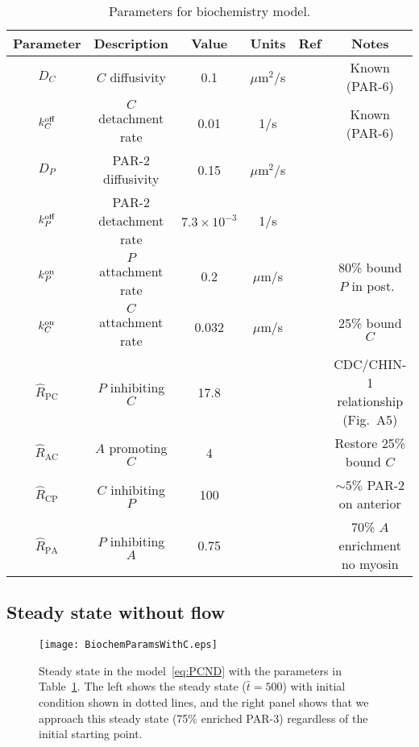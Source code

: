 \documentclass[11pt]{article}
\newcommand{\6}[1]{#1_{\text{6}}}
\newcommand{\3}[1]{#1_{\text{3}}}
\newcommand{\C}[1]{#1_C}
\begin{document}
\begin{table}
\begin{small}
\centering
\begin{tabular}{|c|c|c|c|c|c|}\hline
Parameter & Description & Value & Units & Ref & Notes \\ \hline
$\C{D}$ & $C$ diffusivity & 0.1 & $\mu$m$^2$/s & \cite{robin2014single} & Known (PAR-6)\\
$\C{\koff} $ & $C$ detachment rate & 0.01 & 1/s & \cite{robin2014single}& Known (PAR-6)\\
$D_P$ & PAR-2 diffusivity & 0.15 & $\mu$m$^2$/s & \cite{goehring2011polarization}&  \\ 
$k^\text{off}_P$ & PAR-2 detachment rate & $7.3 \times 10^{-3}$ & 1/s & \cite{goehring2011polarization}& \\ \hline
$k^\text{on}_P$ & $P$ attachment rate & 0.2 & $\mu$m/s & & 80\% bound $P$ in post.\ \cite{gross2019guiding}\\ 
$k^\text{on}_C$ & $C$ attachment rate & 0.032 & $\mu$m/s & & 25\% bound $C$ \cite{gross2019guiding} \\ 
$\hat R_\text{PC}$ & $P$ inhibiting $C$ & 17.8  & & \cite{sailer2015dynamic} & CDC/CHIN-1 relationship (Fig.\ A5)\\ 
$\hat R_\text{AC}$ & $A$ promoting $C$ & 4 & &  &  Restore 25\% bound $C$\\
$\hat R_\text{CP}$ & $C$ inhibiting $P$ & 100  & & &$\sim 5\%$ PAR-2 on anterior \cite{gross2019guiding} \\
$\hat R_\text{PA}$& $P$ inhibiting $A$ & 0.75 & & & 70\% $A$ enrichment no myosin  \cite{zonies2010symmetry, gross2019guiding}\\ \hline
\end{tabular}
\caption{\label{tab:paramsC} Parameters for biochemistry model.}
\end{small}
\end{table}

\subsection{Steady state without flow}

\begin{figure}
\centering
\texttt{[image: BiochemParamsWithC.eps]}
\caption{\label{fig:StStC}Steady state in the model\ \eqref{eq:PCND} with the parameters in Table\ \ref{tab:paramsC}. The left shows the steady state ($\hat t = 500$) with initial condition shown in dotted lines, and the right panel shows that we approach this steady state (75\% enriched PAR-3) regardless of the initial starting point. }
\end{figure}
\end{document}
